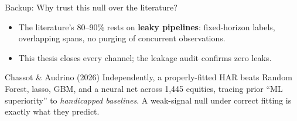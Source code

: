 \documentclass[aspectratio=169, t]{beamer}
\begin{document}

\begin{frame}{Backup: Why trust this null over the literature?}
\vspace{-0.4em}

\begin{itemize}\footnotesize
  \item The literature's 80--90\% rests on \textbf{leaky pipelines}: fixed-horizon labels, overlapping spans, no purging of concurrent observations.
  \item This thesis closes every channel; the leakage audit confirms zero leaks.
\end{itemize}

\vspace{0.5em}
{
\begin{block}{Chassot \& Audrino (2026)}
\footnotesize
Independently, a properly-fitted HAR beats Random Forest, lasso, GBM, and a neural net across 1{,}445 equities, tracing prior ``ML superiority'' to \emph{handicapped baselines}. A weak-signal null under correct fitting is exactly what they predict.
\end{block}
}
\end{frame}
\end{document}
